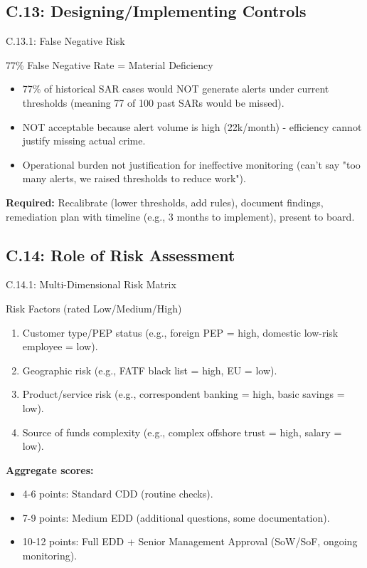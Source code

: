 \documentclass{beamer}
\begin{document}
	\subsection{C.13: Designing/Implementing Controls}
	
	\begin{frame}{C.13.1: False Negative Risk}
		\begin{block}{77\% False Negative Rate = Material Deficiency}
			\begin{itemize}
				\item 77\% of historical SAR cases would NOT generate alerts under current thresholds (meaning 77 of 100 past SARs would be missed).
				\item NOT acceptable because alert volume is high (22k/month) - efficiency cannot justify missing actual crime.
				\item Operational burden not justification for ineffective monitoring (can't say "too many alerts, we raised thresholds to reduce work").
			\end{itemize}
			\textbf{Required:} Recalibrate (lower thresholds, add rules), document findings, remediation plan with timeline (e.g., 3 months to implement), present to board.
		\end{block}
	\end{frame}
	
	\subsection{C.14: Role of Risk Assessment}
	
	\begin{frame}{C.14.1: Multi-Dimensional Risk Matrix}
		\begin{block}{Risk Factors (rated Low/Medium/High)}
			\begin{enumerate}
				\item Customer type/PEP status (e.g., foreign PEP = high, domestic low-risk employee = low).
				\item Geographic risk (e.g., FATF black list = high, EU = low).
				\item Product/service risk (e.g., correspondent banking = high, basic savings = low).
				\item Source of funds complexity (e.g., complex offshore trust = high, salary = low).
			\end{enumerate}
			\textbf{Aggregate scores:}
			\begin{itemize}
				\item 4-6 points: Standard CDD (routine checks).
				\item 7-9 points: Medium EDD (additional questions, some documentation).
				\item 10-12 points: Full EDD + Senior Management Approval (SoW/SoF, ongoing monitoring).
			\end{itemize}
		\end{block}
	\end{frame}
	
\end{document}
